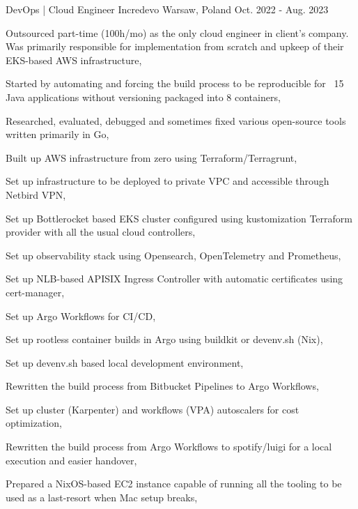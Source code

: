 

\begin{cventries}

  \cventry
  {DevOps | Cloud Engineer} %
  {Incredevo} %
  {Warsaw, Poland} %
  {Oct. 2022 - Aug. 2023} %
  {
    \begin{cvitems} %
      \item {Outsourced part-time (100h/mo) as the only cloud engineer in client's company. Was primarily responsible for implementation from scratch and upkeep of their EKS-based AWS infrastructure,}
      \item {Started by automating and forcing the build process to be reproducible for ~15 Java applications without versioning packaged into 8 containers,}
      \item {Researched, evaluated, debugged and sometimes fixed various open-source tools written primarily in Go,}
      \item {Built up AWS infrastructure from zero using Terraform/Terragrunt,}
      \item {Set up infrastructure to be deployed to private VPC and accessible through Netbird VPN,}
      \item {Set up Bottlerocket based EKS cluster configured using kustomization Terraform provider with all the usual cloud controllers,}
      \item {Set up observability stack using Opensearch, OpenTelemetry and Prometheus,}
      \item {Set up NLB-based APISIX Ingress Controller with automatic certificates using cert-manager,}
      \item {Set up Argo Workflows for CI/CD,}
      \item {Set up rootless container builds in Argo using buildkit or devenv.sh (Nix),}
      \item {Set up devenv.sh based local development environment,}
      \item {Rewritten the build process from Bitbucket Pipelines to Argo Workflows,}
      \item {Set up cluster (Karpenter) and workflows (VPA) autoscalers for cost optimization,}
      \item {Rewritten the build process from Argo Workflows to spotify/luigi for a local execution and easier handover,}
      \item {Prepared a NixOS-based EC2 instance capable of running all the tooling to be used as a last-resort when Mac setup breaks,}
    \end{cvitems}
  }


\end{cventries}
